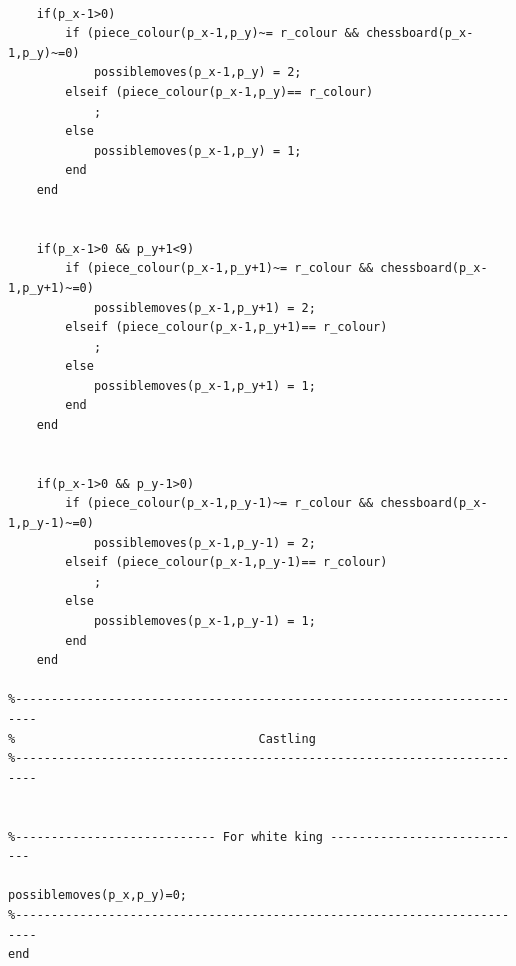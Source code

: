 \documentclass[11pt,a4paper]{article}
\begin{document}
\begin{lstlisting}
    
    if(p_x-1>0)
        if (piece_colour(p_x-1,p_y)~= r_colour && chessboard(p_x-1,p_y)~=0)
            possiblemoves(p_x-1,p_y) = 2;
        elseif (piece_colour(p_x-1,p_y)== r_colour)
            ;
        else
            possiblemoves(p_x-1,p_y) = 1;
        end
    end
    
    
    if(p_x-1>0 && p_y+1<9)
        if (piece_colour(p_x-1,p_y+1)~= r_colour && chessboard(p_x-1,p_y+1)~=0)
            possiblemoves(p_x-1,p_y+1) = 2;
        elseif (piece_colour(p_x-1,p_y+1)== r_colour)
            ;
        else
            possiblemoves(p_x-1,p_y+1) = 1;
        end
    end
    
    
    if(p_x-1>0 && p_y-1>0)
        if (piece_colour(p_x-1,p_y-1)~= r_colour && chessboard(p_x-1,p_y-1)~=0)
            possiblemoves(p_x-1,p_y-1) = 2;
        elseif (piece_colour(p_x-1,p_y-1)== r_colour)
            ;
        else
            possiblemoves(p_x-1,p_y-1) = 1;
        end
    end

%-------------------------------------------------------------------------   
%                                  Castling 
%-------------------------------------------------------------------------


%---------------------------- For white king ----------------------------
   
possiblemoves(p_x,p_y)=0;
%-------------------------------------------------------------------------
end
\end{lstlisting}
\end{document}
